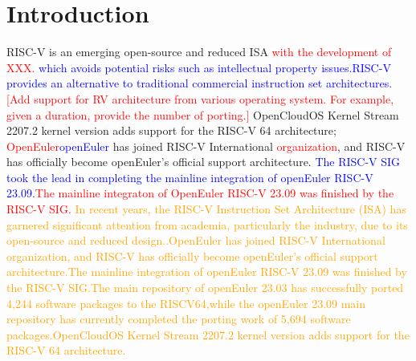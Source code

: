 \documentclass[sigconf,screen,review,anonymous]{acmart}
\begin{document}
\section{Introduction}
RISC-V is an emerging open-source and reduced ISA \textcolor{red}{with the development of XXX.} \textcolor{blue}{which avoids potential risks such as intellectual property issues\cite{2014The}.RISC-V provides an alternative to traditional commercial instruction set architectures.} \textcolor{red}{[Add support for RV architecture from various operating system. For example, given a duration, provide the number of porting.]} OpenCloudOS Kernel Stream 2207.2 kernel version adds support for the RISC-V 64 architecture\cite{osti_1560133}; \textcolor{red}{OpenEuler}\textcolor{blue}{openEuler} has joined RISC-V International \textcolor{red}{organization}, and RISC-V has officially become openEuler's official support architecture.\textcolor{blue}{ The RISC-V SIG took the lead in completing the mainline integration of openEuler RISC-V 23.09\cite{osti_1560132}}.\textcolor{red}{The mainline integraton of OpenEuler RISC-V 23.09\cite{osti_1560132} was finished by the RISC-V SIG.}
\textcolor{orange}{In recent years, the RISC-V Instruction Set Architecture (ISA) has garnered significant attention from academia, particularly the industry, due to its open-source and reduced design.\citep{2014The}.OpenEuler has joined RISC-V International organization, and RISC-V has officially become openEuler's official support architecture.The mainline integration of openEuler RISC-V 23.09 was finished by the RISC-V SIG.The main repository of openEuler 23.03 has successfully ported 4,244 software packages to the RISCV64,while the openEuler 23.09 main repository has currently completed the porting work of 5,694 software packages\citep{osti_1560132}.OpenCloudOS Kernel Stream 2207.2 kernel version adds support for the RISC-V 64 architecture\citep{osti_1560133}.}
\end{document}
